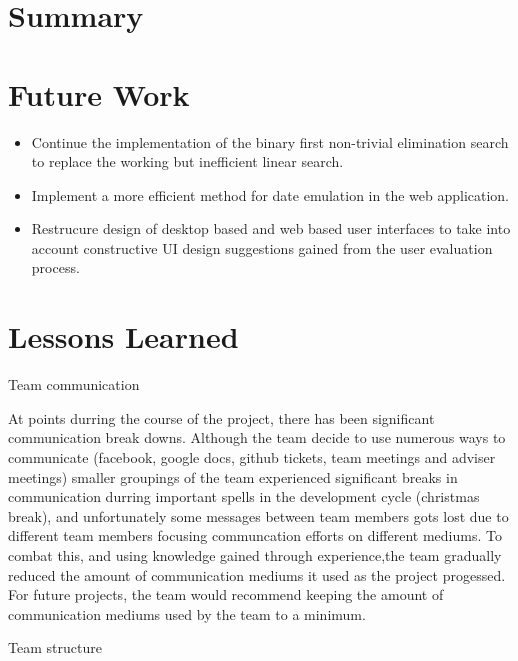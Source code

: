 \section{Summary}

\section{Future Work}

\begin{itemize}
\item Continue the implementation of the binary first non-trivial elimination
search to replace the working but inefficient linear search.
\item Implement a more efficient method for date emulation in the web
application.
\item Restrucure design of desktop based and web based user interfaces to take into account constructive UI design suggestions gained from the user evaluation process. 
 

\end{itemize}

\section{Lessons Learned}

Team communication 

At points durring the course of the project, there has been significant communication break downs. Although the team decide to use numerous ways to communicate (facebook, google docs, github tickets, team meetings and adviser meetings) smaller groupings of the team experienced significant breaks in communication durring important spells in the development cycle (christmas break), and unfortunately some messages between team members gots lost due to different team members focusing communcation efforts on different mediums.  To combat this, and using knowledge gained through experience,the team gradually reduced the amount of communication mediums it used as the project progessed. For future projects, the team would recommend keeping the amount of communication mediums used by the team to a minimum.      

Team structure 

